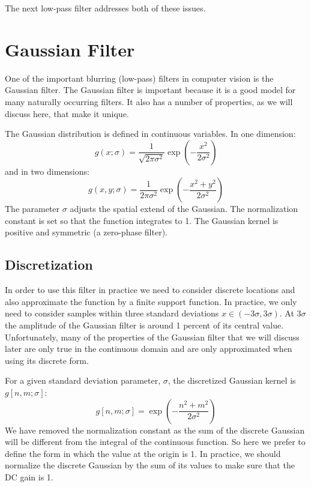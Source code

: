 The next low-pass filter addresses both of these issues.

\section{Gaussian Filter}
\label{sec:spt_gaussian}

One of the important blurring (low-pass) filters in computer vision is the Gaussian filter.
The Gaussian filter is important because it is a good model for many naturally occurring filters. It also has a number of properties, as we will discuss here, that make it unique.

The Gaussian distribution is defined in continuous variables. In one dimension:
\begin{equation}
	g(x; \sigma) = \frac{1}{\sqrt{2 \pi \sigma^2}} \exp{ \left( -\frac{x^2}{2 \sigma^2} \right) }
	\label{eq:gauss1dcont}
\end{equation}
and in two dimensions:
\begin{equation}
	g(x,y; \sigma) = \frac{1}{2 \pi \sigma^2} \exp{ \left(-\frac{x^2 +
			y^2}{2 \sigma^2} \right) }
	\label{eq:gauss2dcont}
\end{equation}
The parameter $\sigma$ adjusts the spatial extend of the Gaussian. The normalization constant is set so that the function integrates to 1. The Gaussian kernel is positive and symmetric (a zero-phase filter).




\subsection{Discretization}



In order to use this filter in practice we need to consider discrete locations and also approximate the function by a finite support function. In practice, we only need to consider samples within three standard deviations $x \in (-3\sigma, 3\sigma)$. At $3\sigma$ the amplitude of the Gaussian filter is around 1 percent of its central value. Unfortunately, many of the properties of the Gaussian filter that we will discuss later are only true in the continuous domain and are only approximated when using its discrete form.

For a given standard deviation parameter, $\sigma$, the discretized Gaussian kernel is $g \left[n, m; \sigma \right]$:
\begin{equation}
	g \left[ n,m; \sigma \right] = \exp{ \left( -\frac{n^2 + m^2}{2 \sigma^2} \right) }
	\label{eq:gauss2d}
\end{equation}
We have removed the normalization constant as the sum of the discrete Gaussian will be different from the integral of the continuous function. So here we prefer to define the form in which the value at the origin is 1. In practice, we should normalize the discrete Gaussian by the sum of its values to make sure that the DC gain is 1.


